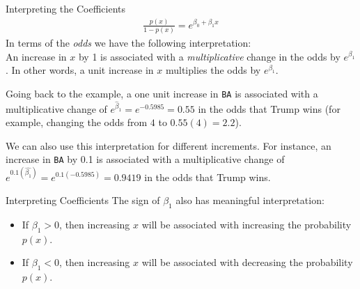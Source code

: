 \documentclass[10pt]{beamer}\usepackage[]{graphicx}\usepackage[]{color}
\begin{document}
\begin{frame}{Interpreting the Coefficients}
\begin{align*}
\frac{p(x)}{1-p(x)} = e^{\beta_0 + \beta_1 x}
\end{align*}
In terms of the \emph{odds} we have the following interpretation:\\ 
\vspace{5pt}
An increase in $x$ by 1 is associated with a \emph{multiplicative} change in the odds by $e^{\beta_1}$.  In other words, a unit increase in $x$ multiplies the odds by $e^{\beta_1}$.
\vspace{10pt}

Going back to the example, a one unit increase in \texttt{BA} is associated with a multiplicative change of $e^{\hat{\beta}_1} = e^{-0.5985} = 0.55$ in the odds that Trump wins (for example, changing the odds from $4$ to $0.55(4)=2.2$).\vspace{10pt}

We can also use this interpretation for different increments.  For instance, an increase in \texttt{BA} by 0.1 is associated with a multiplicative change of $e^{0.1 (\hat{\beta_1})} = e^{0.1(-0.5985)} = 0.9419$ in the odds that Trump wins.
\end{frame}

\begin{frame}{Interpreting Coefficients}
The sign of $\beta_1$ also has meaningful interpretation:
\vspace{5pt}
\begin{itemize}
\item If $\beta_1 > 0$, then increasing $x$ will be associated with increasing the probability $p(x)$.
\vspace{5pt}
\item If $\beta_1 < 0$, then increasing $x$ will be associated with decreasing the probability $p(x)$. 
\end{itemize}
\end{frame}
\end{document}
